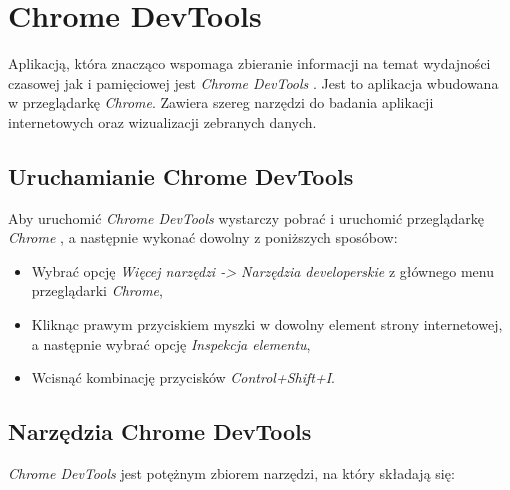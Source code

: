 \documentclass[polish, twoside, 12pt]{mwart}
\let\stdsection\section
\renewcommand*{\section}{\clearpage\stdsection}
\begin{document}
\section{Chrome DevTools}

Aplikacją, która znacząco wspomaga zbieranie informacji na temat wydajności czasowej jak i pamięciowej jest \emph{Chrome DevTools} \cite{chrome-devtools}. Jest to aplikacja wbudowana w przeglądarkę \emph{Chrome}. Zawiera szereg narzędzi do badania aplikacji internetowych oraz wizualizacji zebranych danych.

\subsection{Uruchamianie Chrome DevTools}

Aby uruchomić \emph{Chrome DevTools} wystarczy pobrać i uruchomić przeglądarkę \emph{Chrome} \cite{chrome}, a następnie wykonać dowolny z poniższych sposóbow:

\begin{itemize}
  \item Wybrać opcję \emph{Więcej narzędzi -> Narzędzia developerskie} z głównego menu przeglądarki \emph{Chrome},
  \item Kliknąc prawym przyciskiem myszki w dowolny element strony internetowej, a następnie wybrać opcję \emph{Inspekcja elementu},
  \item Wcisnąć kombinację przycisków \emph{Control+Shift+I}.
\end{itemize}

\subsection{Narzędzia Chrome DevTools}

\emph{Chrome DevTools} jest potężnym zbiorem narzędzi, na który składają się:
\end{document}
